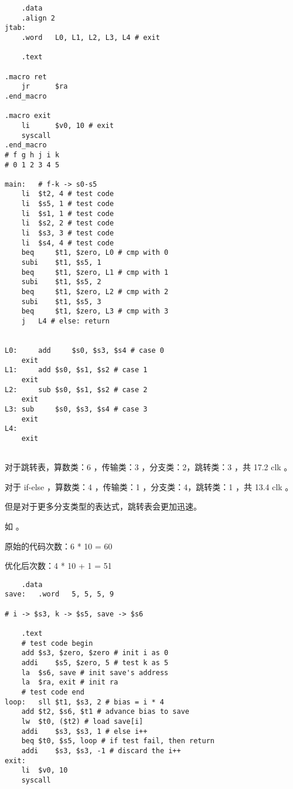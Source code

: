 \documentclass[lang=cn,11pt,a4paper,cite=authoryear]{elegantpaper}
\begin{document}
\begin{lstlisting}
	.data
	.align 2
jtab:
	.word	L0, L1, L2, L3, L4 # exit

	.text 

.macro ret
	jr   	$ra
.end_macro 

.macro exit
	li      $v0, 10	# exit
	syscall
.end_macro
# f g h j i k
# 0 1 2 3 4 5

main:	# f-k -> s0-s5
	li	$t2, 4 # test code 
	li	$s5, 1 # test code 
	li	$s1, 1 # test code 
	li	$s2, 2 # test code 
	li	$s3, 3 # test code 
	li	$s4, 4 # test code 
	beq 	$t1, $zero, L0 # cmp with 0
	subi	$t1, $s5, 1
 	beq 	$t1, $zero, L1 # cmp with 1
	subi	$t1, $s5, 2
	beq 	$t1, $zero, L2 # cmp with 2
	subi	$t1, $s5, 3
	beq 	$t1, $zero, L3 # cmp with 3
	j 	L4 # else: return

	
L0: 	add 	$s0, $s3, $s4 # case 0
	exit 
L1: 	add	$s0, $s1, $s2 # case 1
	exit
L2: 	sub	$s0, $s1, $s2 # case 2
	exit
L3:	sub 	$s0, $s3, $s4 # case 3
	exit
L4: 				
	exit
	
\end{lstlisting}    


对于跳转表，算数类：6 ，传输类：3 ，分支类：2，跳转类：3 ，共 17.2 clk 。

对于 if-else ，算数类：4 ，传输类：1 ，分支类：4，跳转类：1 ，共 13.4 clk 。

但是对于更多分支类型的表达式，跳转表会更加迅速。


如 。




原始的代码次数：6 * 10 = 60

优化后次数：4 * 10 + 1 = 51

\begin{lstlisting}
 	.data
save:	.word 	5, 5, 5, 9

# i -> $s3, k -> $s5, save -> $s6

	.text
	# test code begin
	add	$s3, $zero, $zero # init i as 0
	addi	$s5, $zero, 5 # test k as 5
	la	$s6, save # init save's address 
	la 	$ra, exit # init ra
	# test code end
loop:	sll	$t1, $s3, 2 # bias = i * 4
	add	$t2, $s6, $t1 # advance bias to save 
	lw	$t0, ($t2) # load save[i]
	addi	$s3, $s3, 1 # else i++
	beq	$t0, $s5, loop # if test fail, then return
	addi 	$s3, $s3, -1 # discard the i++
exit:	
	li	$v0, 10
	syscall
	
\end{lstlisting}    
\end{document}
